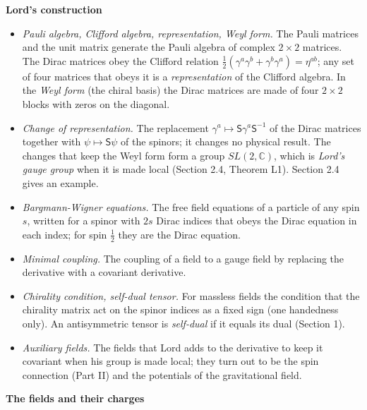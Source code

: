 \documentclass[
  10pt,
]{article}
\providecommand{\tightlist}{%
  \setlength{\itemsep}{0pt}\setlength{\parskip}{0pt}}
\begin{document}
\textbf{Lord's construction}

\begin{itemize}
\tightlist
\item
  \emph{Pauli algebra, Clifford algebra, representation, Weyl form.} The
  Pauli matrices and the unit matrix generate the Pauli algebra of
  complex \(2\times2\) matrices. The Dirac matrices obey the Clifford
  relation \(\tfrac12(\gamma^a\gamma^b+\gamma^b\gamma^a)=\eta^{ab}\);
  any set of four matrices that obeys it is a \emph{representation} of
  the Clifford algebra. In the \emph{Weyl form} (the chiral basis) the
  Dirac matrices are made of four \(2\times2\) blocks with zeros on the
  diagonal.
\item
  \emph{Change of representation.} The replacement
  \(\gamma^a\mapsto\mathsf S\gamma^a\mathsf S^{-1}\) of the Dirac
  matrices together with \(\psi\mapsto\mathsf S\psi\) of the spinors; it
  changes no physical result. The changes that keep the Weyl form form a
  group \(SL(2,\mathbb C)\), which is \emph{Lord's gauge group} when it
  is made local (Section 2.4, Theorem L1). Section 2.4 gives an example.
\item
  \emph{Bargmann-Wigner equations.} The free field equations of a
  particle of any spin \(s\), written for a spinor with \(2s\) Dirac
  indices that obeys the Dirac equation in each index; for spin
  \(\tfrac12\) they are the Dirac equation.
\item
  \emph{Minimal coupling.} The coupling of a field to a gauge field by
  replacing the derivative with a covariant derivative.
\item
  \emph{Chirality condition, self-dual tensor.} For massless fields the
  condition that the chirality matrix act on the spinor indices as a
  fixed sign (one handedness only). An antisymmetric tensor is
  \emph{self-dual} if it equals its dual (Section 1).
\item
  \emph{Auxiliary fields.} The fields that Lord adds to the derivative
  to keep it covariant when his group is made local; they turn out to be
  the spin connection (Part II) and the potentials of the gravitational
  field.
\end{itemize}

\textbf{The fields and their charges}
\end{document}
